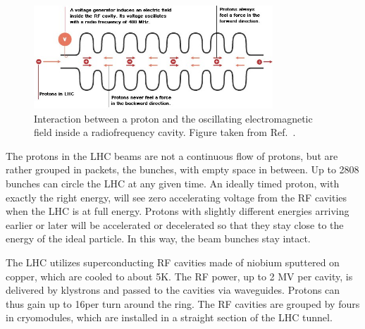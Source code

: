 \begin{figure}[htpb]
  \centering
  \includegraphics[width=0.8\textwidth]{figures/lhc/RF_explanation}
  \caption{Interaction between a proton and the oscillating electromagnetic field inside a
radiofrequency cavity. Figure taken from Ref.~\cite{RF_explanation}.
  \label{fig:RF_explanation}}
\end{figure}

The protons in the LHC beams are not a continuous flow of protons, but are rather grouped in
packets, the bunches, with empty space in between. Up to 2808 bunches can circle the LHC at any
given time. An ideally timed proton, with exactly the right energy, will see zero
accelerating voltage from the RF cavities when the LHC is at full energy. Protons with slightly
different energies arriving earlier or later will be accelerated or decelerated so that they stay
close to the energy of the ideal particle. In this way, the beam bunches stay intact. 

The LHC utilizes superconducting RF cavities made of niobium sputtered on copper, which are
cooled to about 5K. The RF power, up to 2 MV per cavity, is delivered by klystrons and passed to the
cavities via waveguides. Protons can thus gain up to 16\MeV per turn around the ring. The RF
cavities are grouped by fours in cryomodules, which are installed in a straight section of the LHC
tunnel. 






